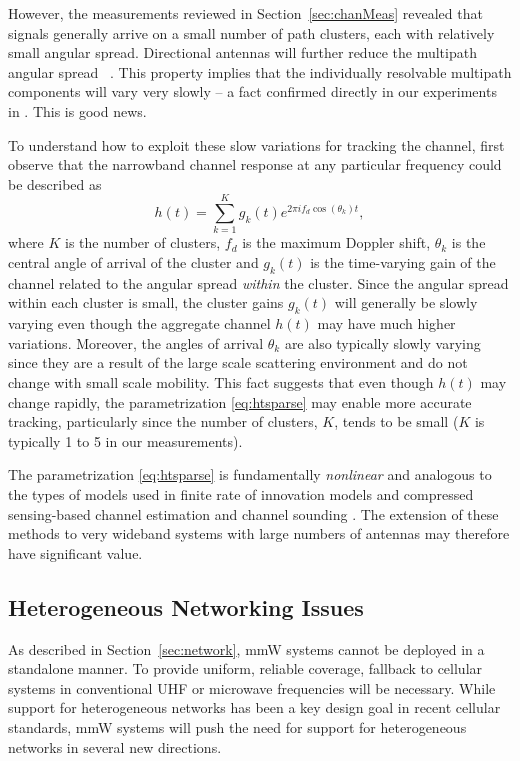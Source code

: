 \documentclass[journal]{IEEEtran}
\def\beq{\begin{equation}}
\def\eeq{\end{equation}}
\begin{document}
However, the measurements reviewed in Section~\ref{sec:chanMeas}
revealed that signals generally arrive on a small number
of path clusters, each with relatively small angular spread.
Directional antennas will further reduce the multipath angular spread
~\cite{durgin2000theory}.
This property implies that the individually resolvable multipath components
will vary very slowly -- a fact confirmed directly in our
experiments in \cite{rappaportmillimeter}.  This is good news.

To understand how to exploit these slow variations for tracking the channel,
first observe that
the narrowband channel response at any particular frequency could be described as
\beq\label{eq:htsparse}
    h(t) = \sum_{k=1}^K g_k(t)e^{2\pi i f_{d}\cos(\theta_k)t},
\eeq
where $K$ is the number of clusters, $f_d$ is the
maximum Doppler shift, $\theta_k$ is the central angle of arrival
of the cluster and $g_k(t)$ is the time-varying gain of the channel related to the
angular spread \emph{within} the cluster.
Since the angular spread within each cluster is small,
the cluster gains $g_k(t)$ will generally be slowly
varying even though the aggregate channel $h(t)$ may have much higher variations.
Moreover, the angles of arrival $\theta_k$ are also typically slowly varying
since they are a result of the large scale scattering environment and do not change
with small scale mobility.  This fact suggests that even though $h(t)$ may change
rapidly, the parametrization \eqref{eq:htsparse} may enable more accurate tracking,
particularly since the number of clusters, $K$, tends to be small ($K$ is typically
1 to 5 in our measurements).

The parametrization \eqref{eq:htsparse} is fundamentally \emph{nonlinear}
and analogous to the types of models used in finite rate of innovation models
\cite{VetterliMB:02} and compressed sensing-based channel estimation
and channel sounding \cite{TaubockHlaw:08,HauptBRN:10,BarbotinHRV:11,tamir2012analog}.
The extension
of these methods to very wideband systems with large numbers of antennas may therefore
have significant value.

\subsection{Heterogeneous Networking Issues} \label{sec:hetNet}

As described in Section~\ref{sec:network},
mmW systems cannot be deployed in a standalone manner.
To provide uniform, reliable coverage, fallback to cellular
systems in conventional UHF or microwave frequencies will be necessary.
While support for heterogeneous networks has been a key design goal
in recent cellular standards,  mmW systems will push the need for support
for heterogeneous networks in several new directions.
\end{document}
